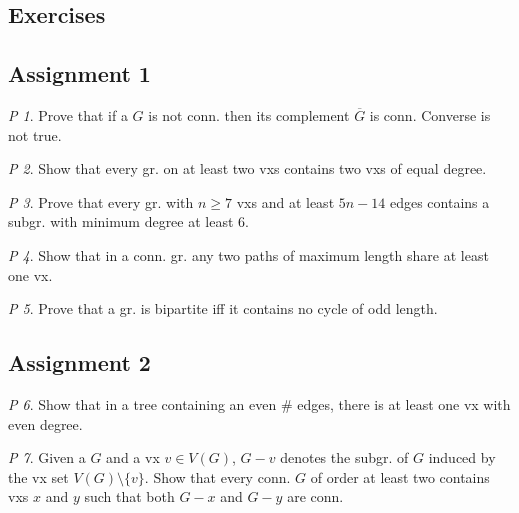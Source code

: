 \documentclass[11pt, fleqn, a4paper, landscape]{article}
\theoremstyle{plain} %
\theoremstyle{remark} %
\newtheorem{problem}{P}
\theoremstyle{definition} %
\begin{document}
\begin{multicols}{5}
\section{Exercises}
\subsection{Assignment 1}


\addtocounter{problem}{1}

\addtocounter{problem}{1}

\begin{problem}
Prove that if a $G$ is not conn. then its complement $\overline{G}$ is conn. Converse is not true.
\end{problem}

\begin{problem}
Show that every gr. on at least two vxs contains two vxs of equal
degree.
\end{problem}

\begin{problem}
Prove that every gr. with $n \ge 7$ vxs and at least $5n- 14$ edges contains a subgr. with minimum degree at least 6.
\end{problem}

\begin{problem}
Show that in a conn. gr. any two paths of maximum length share at least
one vx.
\end{problem}

\begin{problem}
Prove that a gr. is bipartite iff it contains no cycle of odd length.
\end{problem}

\subsection{Assignment 2}

\begin{problem}
Show that in a tree containing an even \# edges, there is at least one
vx with even degree.
\end{problem}

\begin{problem}
Given a $G$ and a vx $v \in V (G)$, $G - v$ denotes the subgr. of $G$ induced by the vx set $V (G)\setminus\{v\}$. Show that every conn. $G$ of order at least two contains vxs $x$ and $y$ such that both $G- x$ and $G-y$ are conn.
\end{problem}


\end{multicols}
\end{document}
